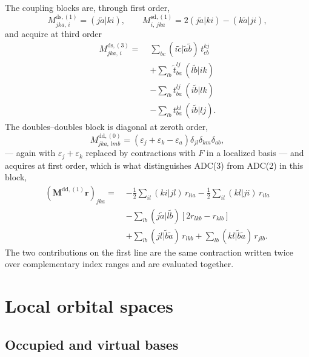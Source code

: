 \documentclass[aip,jcp,amsmath,amssymb,preprint,superscriptaddress]{revtex4-2}%
\newcommand{\pao}[1]{\tilde{#1}}
\begin{document}
The coupling blocks are, through first order,
%
\begin{equation}
  M^{\text{ds},(1)}_{jka,\,i} = (j\pao{a}|ki),
  \qquad
  M^{\text{sd},(1)}_{i,\,jka} = 2(j\pao{a}|ki) - (k\pao{a}|ji),
  \label{eq:mds1}
\end{equation}
%
and acquire at third order
%
\begin{align}
  M^{\text{ds},(3)}_{jka,\,i} =\;
    &\sum_{bc} (i\pao{c}|\pao{a}\pao{b})\, t^{kj}_{cb}
    \tag{D}\\
    &+\sum_{lb} \tilde{t}^{lj}_{ba}\,(l\pao{b}|ik)
    \tag{A}\\
    &-\sum_{lb} t^{lj}_{ba}\,(i\pao{b}|lk)
    \tag{B}\\
    &-\sum_{lb} t^{kl}_{ba}\,(i\pao{b}|lj).
    \tag{C}
\end{align}
%
The doubles--doubles block is diagonal at zeroth order,
%
\begin{equation}
  M^{\text{dd},(0)}_{jka,\,lmb} =
    \left(\varepsilon_j+\varepsilon_k-\varepsilon_a\right)
    \delta_{jl}\delta_{km}\delta_{ab},
  \label{eq:dd0}
\end{equation}
%
--- again with $\varepsilon_j+\varepsilon_k$ replaced by contractions with
$F$ in a localized basis --- and acquires at first order, which is what
distinguishes ADC(3) from ADC(2) in this block,
%
\begin{align}
  \left(\mathbf{M}^{\text{dd},(1)}\mathbf{r}\right)_{jka} =\;
    &-\tfrac12\sum_{il}(ki|jl)\,r_{lia}
      -\tfrac12\sum_{il}(kl|ji)\,r_{ila} \nonumber\\
    &-\sum_{lb}(j\pao{a}|l\pao{b})
       \left[2r_{lkb}-r_{klb}\right] \nonumber\\
    &+\sum_{lb}(jl|\pao{b}\pao{a})\,r_{lkb}
      +\sum_{lb}(kl|\pao{b}\pao{a})\,r_{jlb}.
  \label{eq:dd1}
\end{align}
%
The two contributions on the first line are the same contraction written twice
over complementary index ranges and are evaluated together.

\section{Local orbital spaces}
\label{sec:local}

\subsection{Occupied and virtual bases}
\end{document}
